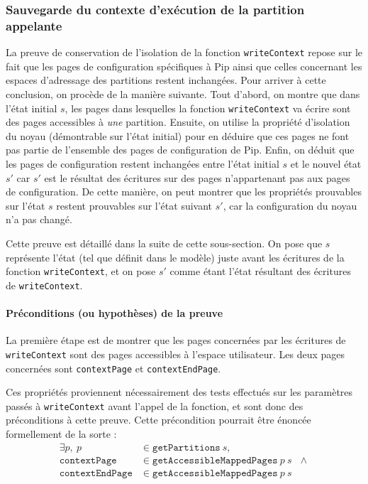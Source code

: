 			\subsubsection{Sauvegarde du contexte d'exécution de la partition appelante}

			La preuve de conservation de l'isolation de la fonction \texttt{writeContext} repose sur le fait que les pages de configuration spécifiques à Pip ainsi que celles concernant les espaces d'adressage des partitions restent inchangées. Pour arriver à cette conclusion, on procède de la manière suivante. Tout d'abord, on montre que dans l'état initial $s$, les pages dans lesquelles la fonction \texttt{writeContext} va écrire sont des pages accessibles à \emph{une} partition. Ensuite, on utilise la propriété d'isolation du noyau (démontrable sur l'état initial) pour en déduire que ces pages ne font pas partie de l'ensemble des pages de configuration de Pip. Enfin, on déduit que les pages de configuration restent inchangées entre l'état initial $s$ et le nouvel état $s'$ car $s'$ est le résultat des écritures sur des pages n'appartenant pas aux pages de configuration. De cette manière, on peut montrer que les propriétés prouvables sur l'état $s$ restent prouvables sur l'état suivant $s'$, car la configuration du noyau n'a pas changé.

			Cette preuve est détaillé dans la suite de cette sous-section. On pose que $s$ représente l'état (tel que définit dans le modèle) juste avant les écritures de la fonction \texttt{writeContext}, et on pose $s'$ comme étant l'état résultant des écritures de \texttt{writeContext}.

			\paragraph{Préconditions (ou hypothèses) de la preuve}

			La première étape est de montrer que les pages concernées par les écritures de \texttt{writeContext} sont des pages accessibles à l'espace utilisateur. Les deux pages concernées sont \texttt{contextPage} et \texttt{contextEndPage}. 

			Ces propriétés proviennent nécessairement des tests effectués sur les paramètres passés à \texttt{writeContext} avant l'appel de la fonction, et sont donc des préconditions à cette preuve. Cette précondition pourrait être énoncée formellement de la sorte :\\
			\begin{align*}
				\exists p,~p &\in \mathtt{getPartitions}~s,\\
				\mathtt{contextPage} &\in \mathtt{getAccessibleMappedPages}~p~s~~~\wedge\\
				\mathtt{contextEndPage} &\in \mathtt{getAccessibleMappedPages}~p~s
			\end{align*}


